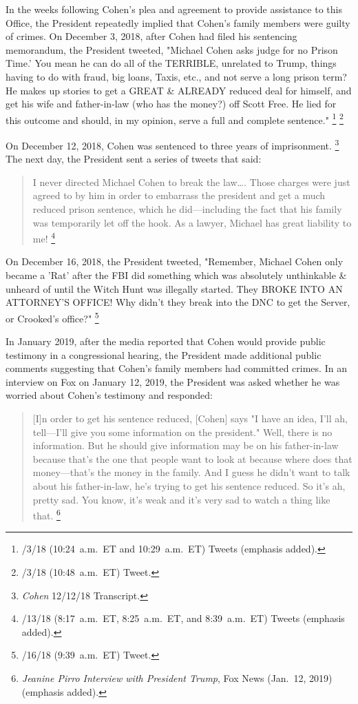 {In the weeks following Cohen's plea and agreement to provide assistance to this Office, the President repeatedly implied that Cohen's family members were guilty of crimes.
On December 3, 2018, after Cohen had filed his sentencing memorandum, the President tweeted, "Michael Cohen asks judge for no Prison Time.'
You mean he can do all of the TERRIBLE, unrelated to Trump, things having to do with fraud, big loans, Taxis, etc., and not serve a long prison term?
He makes up stories to get a GREAT \& ALREADY reduced deal for himself, and get his wife and father-in-law (who has the money?) off Scott Free.
He lied for this outcome and should, in my opinion, serve a full and complete sentence."%
\footnote{/3/18 (10:24~a.m.~ET and 10:29~a.m.~ET) Tweets (emphasis added).}
\footnote{/3/18 (10:48~a.m.~ET) Tweet.}

On December 12, 2018, Cohen was sentenced to three years of imprisonment.%
\footnote{\textit{Cohen} 12/12/18 Transcript.}
The next day, the President sent a series of tweets that said:

\begin{quote}
I never directed Michael Cohen to break the law\dots.
Those charges were just agreed to by him in order to embarrass the president and get a much reduced prison sentence, which he did---including the fact that his family was temporarily let off the hook.
As a lawyer, Michael has great liability to me!%
\footnote{/13/18 (8:17~a.m.~ET, 8:25~a.m.~ET, and 8:39~a.m.~ET) Tweets (emphasis added).}
\end{quote}

On December 16, 2018, the President tweeted, "Remember, Michael Cohen only became a 'Rat' after the FBI did something which was absolutely unthinkable \& unheard of until the Witch Hunt was illegally started.
They BROKE INTO AN ATTORNEY'S OFFICE!
Why didn't they break into the DNC to get the Server, or Crooked's office?"%
\footnote{/16/18 (9:39~a.m.~ET) Tweet.}

In January 2019, after the media reported that Cohen would provide public testimony in a congressional hearing, the President made additional public comments suggesting that Cohen's family members had committed crimes.
In an interview on Fox on January 12, 2019, the President was asked whether he was worried about Cohen's testimony and responded:

\begin{quote}
[I]n order to get his sentence reduced, [Cohen] says "I have an idea, I'll ah, tell---I'll give you some information on the president."
Well, there is no information.
But he should give information may be on his father-in-law because that's the one that people want to look at because where does that money---that's the money in the family.
And I guess he didn't want to talk about his father-in-law, he's trying to get his sentence reduced.
So it's ah, pretty sad.
You know, it's weak and it's very sad to watch a thing like that.%
\footnote{\textit{Jeanine Pirro Interview with President Trump}, Fox News (Jan.~12, 2019) (emphasis added).}
\end{quote}

}
